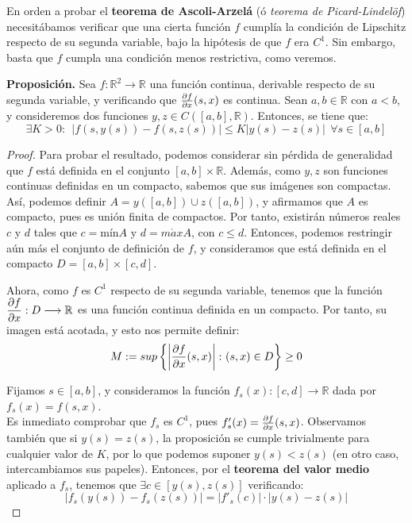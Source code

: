 \begin{ejer} \hfill

En orden a probar el \textbf{teorema de Ascoli-Arzelá} (ó \textit{teorema de Picard-Lindelöf}) necesitábamos verificar que una cierta función $f$ cumplía la condición de Lipschitz respecto de su segunda variable, bajo la hipótesis de que $f$ era $C^1$. Sin embargo, basta que $f$ cumpla una condición menos restrictiva, como veremos.

\textbf{Proposición.} Sea $f:\mathbb{R}^2 \longrightarrow \mathbb{R}$ una función continua, derivable respecto de su segunda variable, y verificando que $\pder[f]{x}(s,x)$ es continua. Sean $a,b \in \mathbb{R}$ con $a < b$, y consideremos dos funciones $y,z \in C([a,b],\mathbb{R})$. Entonces, se tiene que: $$\exists K > 0 : \ \ |f(s,y(s)) - f(s,z(s)) | \le K|y(s)-z(s)| \ \ \forall s \in [a,b]$$

\begin{proof} \hfill

Para probar el resultado, podemos considerar sin pérdida de generalidad que $f$ está definida en el conjunto $[a,b] \times \mathbb{R}$. Además, como $y,z$ son funciones continuas definidas en un compacto, sabemos que sus imágenes son compactas. Así, podemos definir $A = y([a,b]) \cup z([a,b])$, y afirmamos que $A$ es compacto, pues es unión finita de compactos. Por tanto, existirán números reales $c$ y $d$ tales que $c = \text{mín} A$ y $d = m\acute{a}x A$, con $c \le d$. Entonces, podemos restringir aún más el conjunto de definición de $f$, y consideramos que está definida en el compacto $D = [a,b]\times [c,d]$.

Ahora, como $f$ es $C^1$ respecto de su segunda variable, tenemos que la función $\displaystyle\pder[f]{x}: D \longrightarrow \mathbb{R}$ es una función continua definida en un compacto. Por tanto, su imagen está acotada, y esto nos permite definir: $$M := sup \left\{ \left| \pder[f]{x}(s,x) \right|\colon (s,x) \in D\right\} \ge 0$$

Fijamos $s \in [a,b]$, y consideramos la función $f_s(x):[c,d] \longrightarrow \mathbb{R}$ dada por $f_s(x) = f(s,x)$.\\ Es inmediato comprobar que $f_s$ es $C^1$, pues $f_s'(x) = \pder[f]{x}(s,x)$. Observamos también que si $y(s)=z(s)$, la proposición se cumple trivialmente para cualquier valor de $K$, por lo que podemos suponer $y(s) < z(s)$ (en otro caso, intercambiamos sus papeles). Entonces, por el \textbf{teorema del valor medio} aplicado a $f_s$, tenemos que $\exists c \in [y(s), z(s)]$ verificando: $$|f_s(y(s)) - f_s(z(s))| = |f'_s(c)|\cdot|y(s)-z(s)|$$


\end{proof}
\end{ejer}
